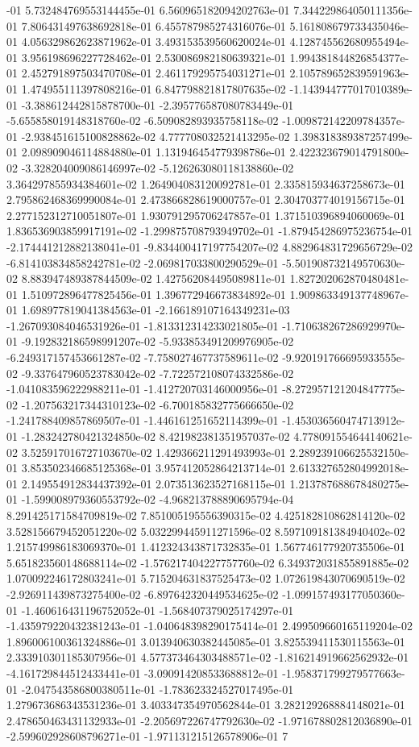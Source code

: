 -01	5.732484769553144455e-01	6.560965182094202763e-01	7.344229864050111356e-01	7.806431497638692818e-01	6.455787985274316076e-01	5.161808679733435046e-01	4.056329862623871962e-01	3.493153539560620024e-01	4.128745562680955494e-01	3.956198696227728462e-01	2.530086982180639321e-01	1.994381844826854377e-01	2.452791897503470708e-01	2.461179295754031271e-01	2.105789652839591963e-01	1.474955111397808216e-01	6.847798821817807635e-02	-1.143944777017010389e-01	-3.388612442815878700e-01	-2.395776587080783449e-01	-5.655858019148318760e-02	-6.509082893935758118e-02	-1.009872142209784357e-01	-2.938451615100828862e-02	4.777708032521413295e-02	1.398318389387257499e-01	2.098909046114884880e-01	1.131946454779398786e-01	2.422323679014791800e-02	-3.328204009086146997e-02	-5.126263080118138860e-02	3.364297855934384601e-02	1.264904083120092781e-01	2.335815934637258673e-01	2.795862468369990084e-01	2.473866828619000757e-01	2.304703774019156715e-01	2.277152312710051807e-01	1.930791295706247857e-01	1.371510396894060069e-01	1.836536903859917191e-02	-1.299875708793949702e-01	-1.879454286975236754e-01	-2.174441212882138041e-01	-9.834400417197754207e-02	4.882964831729656729e-02	-6.814103834858242781e-02	-2.069817033800290529e-01	-5.501908732149570630e-02	8.883947489387844509e-02	1.427562084495089811e-01	1.827202062870480481e-01	1.510972896477825456e-01	1.396772946673834892e-01	1.909863349137748967e-01	1.698977819041384563e-01	-2.166189107164349231e-03	-1.267093084046531926e-01	-1.813312314233021805e-01	-1.710638267286929970e-01	-9.192832186598991207e-02	-5.933853491209976905e-02	-6.249317157453661287e-02	-7.758027467737589611e-02	-9.920191766695933555e-02	-9.337647960523783042e-02	-7.722572108074332586e-02	-1.041083596222988211e-01	-1.412720703146000956e-01	-8.272957121204847775e-02	-1.207563217344310123e-02	-6.700185832775666650e-02	-1.241788409857869507e-01	-1.446161251652114399e-01	-1.453036560474713912e-01	-1.283242780421324850e-02	8.421982381351957037e-02	4.778091554644140621e-02	3.525917016727103670e-02	1.429366211291493993e-01	2.289239106625532150e-01	3.853502346685125368e-01	3.957412052864213714e-01	2.613327652804992018e-01	2.149554912834437392e-01	2.073513623527168115e-01	1.213787688678480275e-01	-1.599008979360553792e-02	-4.968213788890695794e-04	8.291425171584709819e-02	7.851005195556390315e-02	4.425182810862814120e-02	3.528156679452051220e-02	5.032299445911271596e-02	8.597109181384940402e-02	1.215749986183069370e-01	1.412324343871732835e-01	1.567746177920735506e-01	5.651823560148688114e-02	-1.576217404227757760e-02	6.349372031855891885e-02	1.070092246172803241e-01	5.715204631837525473e-02	1.072619843070690519e-02	-2.926911439873275400e-02	-6.897642320449534625e-02	-1.099157493177050360e-01	-1.460616431196752052e-01	-1.568407379025174297e-01	-1.435979220432381243e-01	-1.040648398290175414e-01	2.499509660165119204e-02	1.896006100361324886e-01	3.013940630382445085e-01	3.825539411530115563e-01	2.333910301185307956e-01	4.577373464303488571e-02	-1.816214919662562932e-01	-4.161729844512433441e-01	-3.090914208533688812e-01	-1.958371799279577663e-01	-2.047543586800380511e-01	-1.783623324527017495e-01	1.279673686343531236e-01	3.403347354970562844e-01	3.282129268884148021e-01	2.478650463431132933e-01	-2.205697226747792630e-02	-1.971678802812036890e-01	-2.599602928608796271e-01	-1.971131215126578906e-01	7